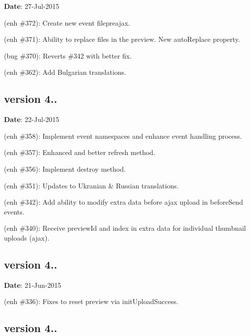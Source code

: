 {\bfseries Date}\+: 27-\/\+Jul-\/2015


\begin{DoxyItemize}
\item (enh \#372)\+: Create new event {\ttfamily filepreajax}.
\item (enh \#371)\+: Ability to replace files in the preview. New {\ttfamily auto\+Replace} property.
\item (bug \#370)\+: Reverts \#342 with better fix.
\item (enh \#362)\+: Add Bulgarian translations.
\end{DoxyItemize}

\subsection*{version 4..}

{\bfseries Date}\+: 22-\/\+Jul-\/2015


\begin{DoxyItemize}
\item (enh \#358)\+: Implement event namespaces and enhance event handling process.
\item (enh \#357)\+: Enhanced and better {\ttfamily refresh} method.
\item (enh \#356)\+: Implement {\ttfamily destroy} method.
\item (enh \#351)\+: Updates to Ukranian \& Russian translations.
\item (enh \#342)\+: Add ability to modify extra data before ajax upload in {\ttfamily before\+Send} events.
\item (enh \#340)\+: Receive {\ttfamily preview\+Id} and {\ttfamily index} in extra data for individual thumbnail uploads (ajax).
\end{DoxyItemize}

\subsection*{version 4..}

{\bfseries Date}\+: 21-\/\+Jun-\/2015


\begin{DoxyItemize}
\item (enh \#336)\+: Fixes to reset preview via {\ttfamily init\+Upload\+Success}.
\end{DoxyItemize}

\subsection*{version 4..}

